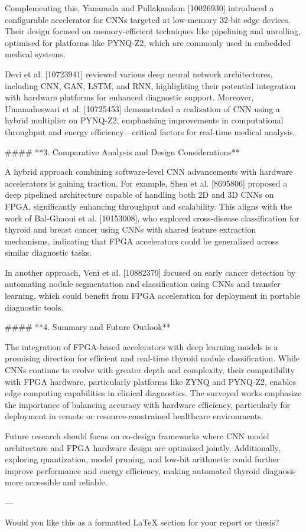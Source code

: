 Complementing this, Yanamala and Pullakandam [10026930] introduced a configurable accelerator for CNNs targeted at low-memory 32-bit edge devices. Their design focused on memory-efficient techniques like pipelining and unrolling, optimised for platforms like PYNQ-Z2, which are commonly used in embedded medical systems.

Devi et al. [10723941] reviewed various deep neural network architectures, including CNN, GAN, LSTM, and RNN, highlighting their potential integration with hardware platforms for enhanced diagnostic support. Moreover, Umamaheswari et al. [10725453] demonstrated a realization of CNN using a hybrid multiplier on PYNQ-Z2, emphasizing improvements in computational throughput and energy efficiency—critical factors for real-time medical analysis.

#### **3. Comparative Analysis and Design Considerations**

A hybrid approach combining software-level CNN advancements with hardware accelerators is gaining traction. For example, Shen et al. [8695806] proposed a deep pipelined architecture capable of handling both 2D and 3D CNNs on FPGA, significantly enhancing throughput and scalability. This aligns with the work of Bal-Ghaoui et al. [10153008], who explored cross-disease classification for thyroid and breast cancer using CNNs with shared feature extraction mechanisms, indicating that FPGA accelerators could be generalized across similar diagnostic tasks.

In another approach, Veni et al. [10882379] focused on early cancer detection by automating nodule segmentation and classification using CNNs and transfer learning, which could benefit from FPGA acceleration for deployment in portable diagnostic tools.

#### **4. Summary and Future Outlook**

The integration of FPGA-based accelerators with deep learning models is a promising direction for efficient and real-time thyroid nodule classification. While CNNs continue to evolve with greater depth and complexity, their compatibility with FPGA hardware, particularly platforms like ZYNQ and PYNQ-Z2, enables edge computing capabilities in clinical diagnostics. The surveyed works emphasize the importance of balancing accuracy with hardware efficiency, particularly for deployment in remote or resource-constrained healthcare environments.

Future research should focus on co-design frameworks where CNN model architecture and FPGA hardware design are optimized jointly. Additionally, exploring quantization, model pruning, and low-bit arithmetic could further improve performance and energy efficiency, making automated thyroid diagnosis more accessible and reliable.

---

Would you like this as a formatted LaTeX section for your report or thesis?




